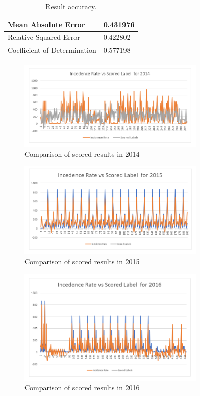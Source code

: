 \documentclass[conference]{IEEEtran}
\begin{document}
\begin{table}[h!]
  \begin{center}
    \caption{Result accuracy.}
    \label{tab:table1}
\begin{tabular}{|l|l|}
\hline
Mean Absolute Error          & 0.431976 \\ \hline
Relative Squared Error       & 0.422802 \\ \hline
Coefficient of Determination & 0.577198 \\ \hline
\end{tabular}
  \end{center}
\end{table}


\begin{figure}[ht!] %
 \centering
 \includegraphics[width=3.5in]{5.png}
 \caption{Comparison of scored results in 2014 }
 \label{compare_score_2014}
 \end{figure}

\begin{figure}[ht!] %
 \centering
 \includegraphics[width=3.5in]{6.png}
 \caption{Comparison of scored results in 2015 }
 \label{compare_score_2015}
 \end{figure}

\begin{figure}[ht!] %
 \centering
 \includegraphics[width=3.5in]{7.png}
 \caption{Comparison of scored results in 2016}
 \label{compare_score_2016}
 \end{figure}
\end{document}

